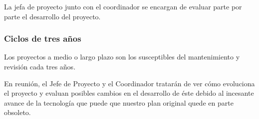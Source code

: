 \documentclass[11pt,a4paper,spanish,twoside]{report}
\begin{document}
La jefa de proyecto junto con el coordinador se encargan de evaluar parte por
parte el desarrollo del proyecto.

\subsubsection{Ciclos de tres años}
Los proyectos a medio o largo plazo son los susceptibles del mantenimiento y 
revisión cada tres años.

En reunión, el Jefe de Proyecto y el Coordinador tratarán de ver cómo 
evoluciona el proyecto y evaluan posibles cambios en el desarrollo de éste 
debido al incesante avance de la tecnología que puede que nuestro plan original
quede en parte obsoleto.

 

\end{document}
